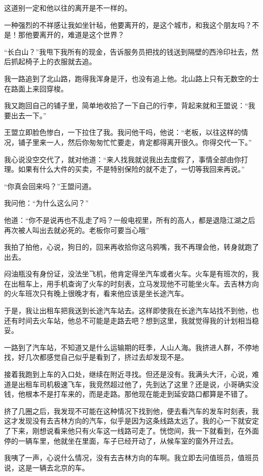 这道别一定和他以往的离开是不一样的。

一种强烈的不祥感让我如坐针毡，他要离开的，是这个城市，和我这个朋友吗？不是！那他要离开的，难道是这个世界？

“长白山？”我甩下我所有的现金，告诉服务员把找的钱送到隔壁的西泠印社去，然后抓起椅子上的衣服就去追。

我一路追到了北山路，跑得我浑身是汗，也没有追上他。北山路上只有无数空的士在路面上来回穿梭。

我又跑回自己的铺子里，简单地收拾了一下自己的行李，背起来就和王盟说：“我要出去一下。”

王盟立即脸色惨白，一下拉住了我。我问他干吗，他说：“老板，以往这样的情况，铺子里来一人，然后你匆匆忙忙要走，肯定都得离开很久。你得交代一下。”

我心说没空交代了，就对他道：“来人找我就说我出去度假了，事情全部由你打理。如果有什么大件的买卖，不是特别保险的就不走了，一切等我回来再说。”

“你真会回来吗？”王盟问道。

我问他：“为什么这么问？”

他道：“你不是说再也不乱走了吗？一般电视里，所有的高人，都是退隐江湖之后再次被人叫出去就必死的。老板你可要当心哦”

我拍了拍他，心说，狗日的，回来再收拾你这乌鸦嘴，我不再理会他，转身就跑了出去。

闷油瓶没有身份证，没法坐飞机，他肯定得坐汽车或者火车。火车是有班次的，我在出租车上，用手机查询了火车的时刻表，立马发现他不可能坐火车。去吉林方向的火车班次只有晚上很晚才有，看来他应该是坐长途汽车。

于是，我让出租车把我送到长途汽车站去。这样即使我在长途汽车站找不到他，也还有时间去火车站，他总不可能是走路去吧？想到这里，我就觉得我的计划相当稳妥。

一路到了汽车站，不知道又是什么运输期的旺季，人山人海。我挤进人群，不停地找，好几次都感觉自己似乎是看到了，挤过去却发现不是。

接着我跑到上车的入口处，继续在附近寻找。但还是没有。我满头大汗，心说，难道是出租车司机极速飞车，我竞然超过他了，先到达了这里？还是说，小哥确实没钱，他根本不是打车来的，而是走路。那他现在能走到延安路口都算是不错了。

挤了几圈之后，我发现不可能在这种情况下找到他，便去看汽车的发车时刻表，我这才发现没有去吉林方向的汽车，似乎是因为这条线路太远了。我的心一下就安定了下来，刚想说看来他只有火车这一线路可走了。恍惚间，我一下就看到，在外面停的一辆车里，他就坐在里面，车子已经开动了，从候车室的窗外开过去。

我咦了一声，心说什么情况，没有去吉林方向的车啊。我立即去问值班员，值班员说，这是一辆去北京的车。

